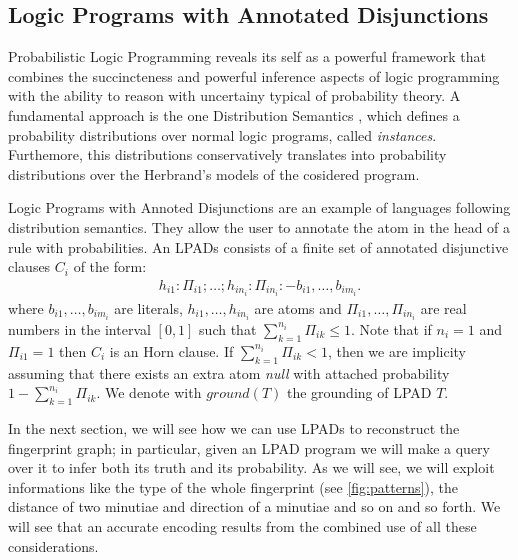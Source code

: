 \documentclass[8pt]{article}
\begin{document}
\subsection{Logic Programs with Annotated Disjunctions}
\label{sub:lpads}
Probabilistic Logic Programming reveals its self as a powerful framework that
combines the succincteness and powerful inference aspects of logic programming
with the ability to reason with uncertainy typical of probability theory.
A fundamental approach is the one Distribution Semantics
\cite{sato1995statistical}, which defines a probability distributions over
normal logic programs, called \emph{instances}. Furthemore, this distributions
conservatively translates into probability distributions over the Herbrand's
models of the cosidered program.

Logic Programs with Annoted Disjunctions \cite{vennekens2004logic} are an
example of languages following distribution semantics. They allow the user to
annotate the atom in the head of a rule with probabilities. An LPADs consists
of a finite set of annotated disjunctive clauses $C_i$ of the form:
  \begin{align*}
    h_{i1}:\Pi_{i1}; \dots ; h_{in_i}:\Pi_{in_i} \colon- b_{i1},\dots,b_{im_i}.
  \end{align*}
where $b_{i1},\dots,b_{im_i}$ are literals, $h_{i1},\dots,h_{in_i}$ are atoms
and $\Pi_{i1},\dots,\Pi_{in_i}$ are real numbers in the interval $[0,1]$ such
that $\sum_{k=1}^{n_i} \Pi_{ik} \le 1$. Note that if $n_i=1$ and $\Pi_{i1}=1$
then $C_i$ is an Horn clause.
If $\sum_{k=1}^{n_i} \Pi_{ik} < 1$, then we are implicity assuming that there
exists an extra atom \emph{null} with attached probability $1-\sum_{k=1}^{n_i}
\Pi_{ik}$. We denote with $ground(T)$ the grounding of LPAD $T$.

In the next section, we will see how we can use LPADs to reconstruct the
fingerprint graph; in particular, given an LPAD program we will make a query
over it to infer both its truth and its probability.  As we will see, we will
exploit informations like the type of the whole fingerprint (see
\cref{fig:patterns}), the distance of two minutiae and direction of a minutiae
and so on and so forth. We will see that an accurate encoding results from the
combined use of all these considerations.







\end{document}
